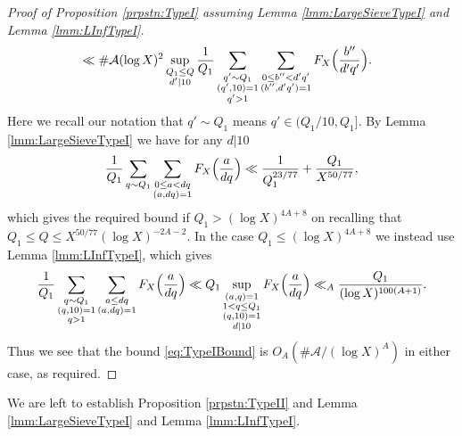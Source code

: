 \documentclass[10pt]{amsart}
\theoremstyle{plain}
\numberwithin{sblmm}{thrm}
\numberwithin{equation}{section}
\begin{document}
\begin{proof}[Proof of Proposition \ref{prpstn:TypeI} assuming Lemma \ref{lmm:LargeSieveTypeI} and Lemma \ref{lmm:LInfTypeI}]
\begin{align}
&\ll \#\mathcal{A}(\log{X})^2\sup_{\substack{Q_1\le Q\\ d'|10}}\frac{1}{Q_1}\sum_{\substack{q'\sim Q_1\\ (q',10)=1\\ q'>1}}\sum_{\substack{0\le b''< d' q'\\ (b'',d' q')=1}}F_X\Bigl(\frac{b''}{d' q'}\Bigr).
\label{eq:TypeIBound}
\end{align}
%
Here we recall our notation that $q'\sim Q_1$ means $q'\in (Q_1/10,Q_1]$. By Lemma \ref{lmm:LargeSieveTypeI} we have for any $d|10$ 
\[
\frac{1}{Q_1}\sum_{q\sim Q_1}\sum_{\substack{0\le a<d q\\ (a,d q)=1}}F_X\Bigl(\frac{a}{d q}\Bigr)\ll \frac{1}{Q_1^{23/77}}+\frac{Q_1}{X^{50/77}},
\]
which gives the required bound if $Q_1>(\log{X})^{4A+8}$ on recalling that $Q_1\le Q\le X^{50/77}(\log{X})^{-2A-2}$. In the case $Q_1\le (\log{X})^{4A+8}$ we instead use Lemma \ref{lmm:LInfTypeI}, which gives
\[
\frac{1}{Q_1}\sum_{\substack{q\sim  Q_1\\ (q,10)=1\\ q>1}}\sum_{\substack{a\le d q \\ (a,d q)=1}}F_X\Bigl(\frac{a}{d q}\Bigr)\ll Q_1\sup_{\substack{(a,q)=1\\ 1<q\le Q_1\\ (q,10)=1\\ d|10}}F_X\Bigl(\frac{a}{d q}\Bigr)\ll_A\frac{Q_1}{(\log{X})^{100(A+1)}}.
\]
Thus we see that the bound \eqref{eq:TypeIBound} is $O_A(\#\mathcal{A}/(\log{X})^A)$ in either case, as required.
\end{proof}
We are left to establish Proposition \ref{prpstn:TypeII} and Lemma \ref{lmm:LargeSieveTypeI} and Lemma \ref{lmm:LInfTypeI}.
%
%
%
%
%
%
%
\end{document}

